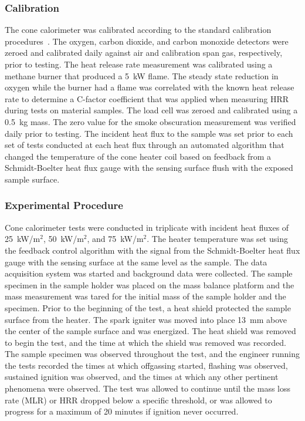\documentclass[12pt,oneside]{book}
\begin{document}
\subsubsection{Calibration}

The cone calorimeter was calibrated according to the standard calibration procedures~\cite{ASTM_E1354}. The oxygen, carbon dioxide, and carbon monoxide detectors were zeroed and calibrated daily against air and calibration span gas, respectively, prior to testing. The heat release rate measurement was calibrated using a methane burner that produced a 5~kW flame. The steady state reduction in oxygen while the burner had a flame was correlated with the known heat release rate to determine a C-factor coefficient that was applied when measuring HRR during tests on material samples. The load cell was zeroed and calibrated using a 0.5~kg mass. The zero value for the smoke obscuration measurement was verified daily prior to testing. The incident heat flux to the sample was set prior to each set of tests conducted at each heat flux through an automated algorithm that changed the temperature of the cone heater coil based on feedback from a Schmidt-Boelter heat flux gauge with the sensing surface flush with the exposed sample surface.

\subsubsection{Experimental Procedure}

Cone calorimeter tests were conducted in triplicate with incident heat fluxes of 25~kW/m$^2$, 50~kW/m$^2$, and 75~kW/m$^2$. The heater temperature was set using the feedback control algorithm with the signal from the Schmidt-Boelter heat flux gauge with the sensing surface at the same level as the sample. The data acquisition system was started and background data were collected. The sample specimen in the sample holder was placed on the mass balance platform and the mass measurement was tared for the initial mass of the sample holder and the specimen. Prior to the beginning of the test, a heat shield protected the sample surface from the heater. The spark igniter was moved into place 13~mm above the center of the sample surface and was energized. The heat shield was removed to begin the test, and the time at which the shield was removed was recorded. The sample specimen was observed throughout the test, and the engineer running the tests recorded the times at which offgassing started, flashing was observed, sustained ignition was observed, and the times at which any other pertinent phenomena were observed. The test was allowed to continue until the mass loss rate (MLR) or HRR dropped below a specific threshold, or was allowed to progress for a maximum of 20 minutes if ignition never occurred. 
\end{document}
